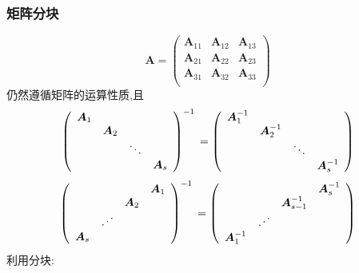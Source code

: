 \documentclass{article}
\begin{document}
			\subsubsection{矩阵分块}
				$$
				\boldsymbol{A} =
				\left(\begin{array}{ccc}
					\boldsymbol{A}_{11} & \boldsymbol{A}_{12} & \boldsymbol{A}_{13} \\
					\boldsymbol{A}_{21} & \boldsymbol{A}_{22} & \boldsymbol{A}_{23} \\
					\boldsymbol{A}_{31} & \boldsymbol{A}_{32} & \boldsymbol{A}_{33} \\
				\end{array}\right)
				$$
				仍然遵循矩阵的运算性质,且
				$$
				\left(\begin{array}{cccc}
					\boldsymbol{A}_{1} & & & \\
					& \boldsymbol{A}_{2} & & \\
					& & \ddots & \\
					& & & \boldsymbol{A}_{s}
				\end{array}\right)^{-1} \\
				=
				\left(\begin{array}{cccc}
					\boldsymbol{A}_{1}^{-1} & & & \\
					& \boldsymbol{A}_{2}^{-1} & & \\
					& & \ddots & \\
					& & & \boldsymbol{A}_{s}^{-1}
				\end{array}\right)
				$$
				$$
				\left(\begin{array}{cccc}
					& & & \boldsymbol{A}_{1} \\
					& & \boldsymbol{A}_{2} & \\
					& \iddots & & \\
					\boldsymbol{A}_{s}& & &
				\end{array}\right)^{-1} \\
				=
				\left(\begin{array}{cccc}
					& & &\boldsymbol{A}_{s}^{-1} \\
					& & \boldsymbol{A}_{s-1}^{-1} & \\
					& \iddots & & \\
					\boldsymbol{A}_{1}^{-1} & & &
				\end{array}\right)
				$$
				利用分块:
\end{document}
